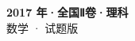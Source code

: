 \documentclass[zihao=-4, a4paper]{ctexart}
\begin{document}
\begin{center}
  {\Large\bfseries 2017 年·全国Ⅱ卷·理科}\\[4pt]
  {\large 数学 · 试题版}
\end{center}
\medskip
{}

\end{document}
